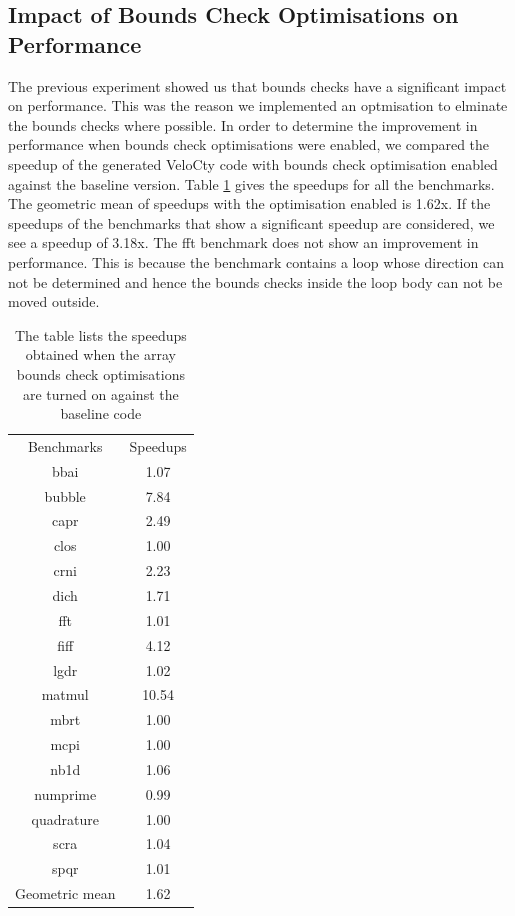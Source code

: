 \subsection{Impact of Bounds Check Optimisations on Performance}
The previous experiment showed us that bounds checks have a significant impact on performance. This was the reason we implemented an optmisation to elminate the bounds checks where possible. In order to determine the improvement in performance when bounds check optimisations were enabled, we compared the speedup of the generated VeloCty code with bounds check optimisation enabled  against the baseline \velocty version. Table \ref{tab:CwvsCbc} gives the speedups for all the benchmarks. The geometric mean of speedups with the optimisation enabled is 1.62x. If the speedups of the benchmarks that show a significant speedup are considered, we see a speedup of 3.18x. The \textsf{fft} benchmark does not show an improvement in performance. This is because the benchmark contains a loop whose direction can not be determined and hence the bounds checks inside the loop body  can not be moved outside.
\begin{table}[h]
\centering
\begin{tabular}{|c|c|}
\hline
Benchmarks     & Speedups \\ \hhline{|=|=|}
bbai           & 1.07     \\ \hline
bubble         & 7.84     \\ \hline
capr           & 2.49     \\ \hline
clos           & 1.00     \\ \hline
crni           & 2.23     \\ \hline
dich           & 1.71     \\ \hline
fft            & 1.01     \\ \hline
fiff           & 4.12     \\ \hline
lgdr           & 1.02     \\ \hline
matmul         & 10.54    \\ \hline
mbrt           & 1.00     \\ \hline
mcpi           & 1.00     \\ \hline
nb1d           & 1.06     \\ \hline
numprime       & 0.99     \\ \hline
quadrature     & 1.00     \\ \hline
scra           & 1.04     \\ \hline
spqr           & 1.01     \\ \hline
Geometric mean & 1.62     \\ \hline
\end{tabular}
\caption[Speedup of \velocty with bounds check optimisation turned on]{The table lists the speedups obtained when the array bounds check optimisations are turned on against the baseline \velocty code}
\label{tab:CwvsCbc}
\end{table}
